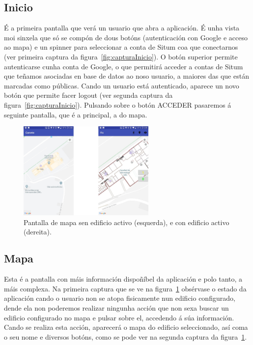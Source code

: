 \subsection{Inicio}
É a primeira pantalla que verá un usuario que abra a aplicación. É unha vista moi sinxela que só se compón de dous botóns (autenticación con Google e acceso ao mapa) e un spinner para seleccionar a conta de Situm coa que conectarnos (ver primeira captura da figura~\ref{fig:capturaInicio}). O botón superior permite autenticarse cunha conta de Google, o que permitirá acceder a contas de Situm que teñamos asociadas en base de datos ao noso usuario, a maiores das que están marcadas como públicas. Cando un usuario está autenticado, aparece un novo botón que permite facer logout (ver segunda captura da figura~\ref{fig:capturaInicio}). Pulsando sobre o botón ACCEDER pasaremos á seguinte pantalla, que é a principal, a do mapa.

\begin{figure}[h]
	\begin{center}
		\includegraphics[width=0.6\textwidth]{figures/android/mapaEdificio}
		\caption{Pantalla de mapa sen edificio activo (esquerda), e con edificio activo (dereita).}
		\label{fig:mapaEdificio}
	\end{center}
\end{figure}


\subsection{Mapa}
Esta é a pantalla con máis información dispoñíbel da aplicación e polo tanto, a máis complexa. Na primeira captura que se ve na figura~\ref{fig:mapaEdificio} obsérvase o estado da aplicación cando o usuario non se atopa fisicamente nun edificio configurado, dende ela non poderemos realizar ningunha acción que non sexa buscar un edificio configurado no mapa e pulsar sobre el, accedendo á súa información. Cando se realiza esta acción, aparecerá o mapa do edificio seleccionado, así coma o seu nome e diversos botóns, como se pode ver na segunda captura da figura~\ref{fig:mapaEdificio}.

